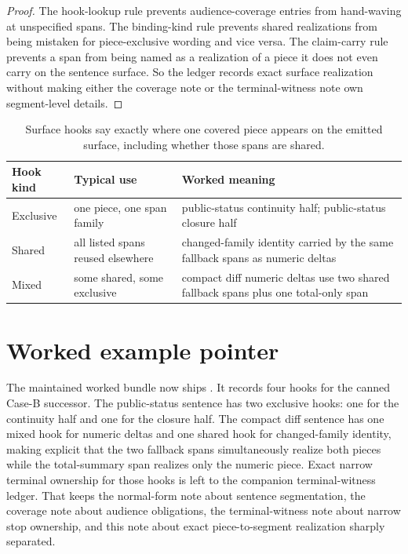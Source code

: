 \documentclass[11pt]{article}
\begin{document}
\begin{proof}
The hook-lookup rule prevents audience-coverage entries from hand-waving at unspecified spans.
The binding-kind rule prevents shared realizations from being mistaken for piece-exclusive wording and vice versa.
The claim-carry rule prevents a span from being named as a realization of a piece it does not even carry on the sentence surface.
So the ledger records exact surface realization without making either the coverage note or the terminal-witness note own segment-level details.
\end{proof}

\begin{table}[t]
\centering
\small
\begin{tabularx}{\linewidth}{@{}l l X@{}}
\toprule
Hook kind & Typical use & Worked meaning \\
\midrule
Exclusive & one piece, one span family & public-status continuity half; public-status closure half \\
Shared & all listed spans reused elsewhere & changed-family identity carried by the same fallback spans as numeric deltas \\
Mixed & some shared, some exclusive & compact diff numeric deltas use two shared fallback spans plus one total-only span \\
\bottomrule
\end{tabularx}
\caption{Surface hooks say exactly where one covered piece appears on the emitted surface, including whether those spans are shared.}
\label{tab:surfacehooks}
\end{table}

\section{Worked example pointer}
The maintained worked bundle now ships .\cite{series:workedexample}
It records four hooks for the canned Case-B successor.
The public-status sentence has two exclusive hooks: one for the continuity half and one for the closure half.
The compact diff sentence has one mixed hook for numeric deltas and one shared hook for changed-family identity, making explicit that the two fallback spans simultaneously realize both pieces while the total-summary span realizes only the numeric piece.
Exact narrow terminal ownership for those hooks is left to the companion terminal-witness ledger.
That keeps the normal-form note about sentence segmentation, the coverage note about audience obligations, the terminal-witness note about narrow stop ownership, and this note about exact piece-to-segment realization sharply separated.\cite{series:downstreamnormalforms,series:challengecoverage,series:challengeterminalwitnesses}
\end{document}
